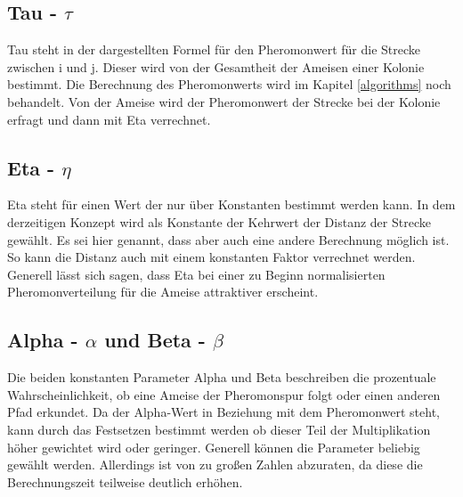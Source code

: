 {	\newpage
	\subsection{Tau - $\tau$}
	Tau steht in der dargestellten Formel für den Pheromonwert für die Strecke zwischen i und j. Dieser wird von der Gesamtheit der Ameisen einer Kolonie bestimmt. Die Berechnung des Pheromonwerts wird im Kapitel \ref{algorithms} noch behandelt. Von der Ameise wird der Pheromonwert der Strecke bei der Kolonie erfragt und dann mit Eta verrechnet.
	
	\subsection{Eta - $\eta$}
	Eta steht für einen Wert der nur über Konstanten bestimmt werden kann. In dem derzeitigen Konzept wird als Konstante der Kehrwert der Distanz der Strecke gewählt. Es sei hier genannt, dass aber auch eine andere Berechnung möglich ist. So kann die Distanz auch mit einem konstanten Faktor verrechnet werden. Generell lässt sich sagen, dass Eta bei einer zu Beginn normalisierten Pheromonverteilung für die Ameise attraktiver erscheint.
	
	\subsection{Alpha - $\alpha$ und Beta - $\beta$}
	Die beiden konstanten Parameter Alpha und Beta beschreiben die prozentuale Wahrscheinlichkeit, ob eine Ameise der Pheromonspur folgt oder einen anderen Pfad erkundet. Da der Alpha-Wert in Beziehung mit dem Pheromonwert steht, kann durch das Festsetzen bestimmt werden ob dieser Teil der Multiplikation höher gewichtet wird oder geringer. Generell können die Parameter beliebig gewählt werden. Allerdings ist von zu großen Zahlen abzuraten, da diese die Berechnungszeit teilweise deutlich erhöhen.
}
